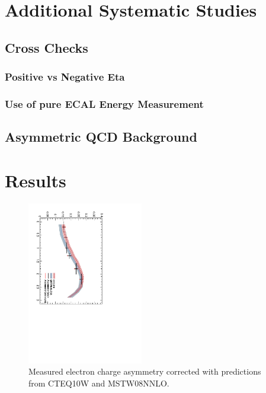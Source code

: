 \section{Additional Systematic Studies}
\subsection{Cross Checks}
\subsubsection{Positive vs Negative Eta}
\subsubsection{Use of pure ECAL Energy Measurement}
\subsection{Asymmetric \ac{QCD} Background}



\section{Results}

\begin{figure}[htb]
  \begin{center}
  \includegraphics*[width=0.45\textwidth,angle=90]{Asym_25}
  \caption{\label{fig:asym25} Measured electron charge asymmetry corrected with predictions from CTEQ10W and MSTW08NNLO.}
  \end{center}
\end{figure}

